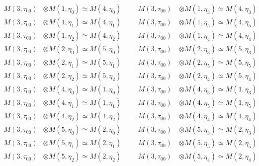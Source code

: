 \begin{align*}
M(3,\tau_{00}) &\otimes M(1,\eta_{0}) \simeq M(4,\eta_{0}) &&& M(3,\tau_{00}) \
&\otimes M(1,\eta_{3}) \simeq M(4,\eta_{3})\\
M(3,\tau_{00}) &\otimes M(1,\eta_{1}) \simeq M(4,\eta_{1}) &&& M(3,\tau_{00}) \
&\otimes M(1,\eta_{5}) \simeq M(4,\eta_{5})\\
M(3,\tau_{00}) &\otimes M(1,\eta_{2}) \simeq M(4,\eta_{2}) &&& M(3,\tau_{00}) \
&\otimes M(1,\eta_{4}) \simeq M(4,\eta_{4})\\
M(3,\tau_{00}) &\otimes M(2,\eta_{0}) \simeq M(5,\eta_{0}) &&& M(3,\tau_{00}) \
&\otimes M(2,\eta_{3}) \simeq M(5,\eta_{3})\\
M(3,\tau_{00}) &\otimes M(2,\eta_{1}) \simeq M(5,\eta_{1}) &&& M(3,\tau_{00}) \
&\otimes M(2,\eta_{5}) \simeq M(5,\eta_{5})\\
M(3,\tau_{00}) &\otimes M(2,\eta_{2}) \simeq M(5,\eta_{2}) &&& M(3,\tau_{00}) \
&\otimes M(2,\eta_{4}) \simeq M(5,\eta_{4})\\
M(3,\tau_{00}) &\otimes M(4,\eta_{0}) \simeq M(1,\eta_{0}) &&& M(3,\tau_{00}) \
&\otimes M(4,\eta_{3}) \simeq M(1,\eta_{3})\\
M(3,\tau_{00}) &\otimes M(4,\eta_{1}) \simeq M(1,\eta_{1}) &&& M(3,\tau_{00}) \
&\otimes M(4,\eta_{5}) \simeq M(1,\eta_{5})\\
M(3,\tau_{00}) &\otimes M(4,\eta_{2}) \simeq M(1,\eta_{2}) &&& M(3,\tau_{00}) \
&\otimes M(4,\eta_{4}) \simeq M(1,\eta_{4})\\
M(3,\tau_{00}) &\otimes M(5,\eta_{0}) \simeq M(2,\eta_{0}) &&& M(3,\tau_{00}) \
&\otimes M(5,\eta_{3}) \simeq M(2,\eta_{3})\\
M(3,\tau_{00}) &\otimes M(5,\eta_{1}) \simeq M(2,\eta_{1}) &&& M(3,\tau_{00}) \
&\otimes M(5,\eta_{5}) \simeq M(2,\eta_{5})\\
M(3,\tau_{00}) &\otimes M(5,\eta_{2}) \simeq M(2,\eta_{2}) &&& M(3,\tau_{00}) \
&\otimes M(5,\eta_{4}) \simeq M(2,\eta_{4})\\
\end{align*}

